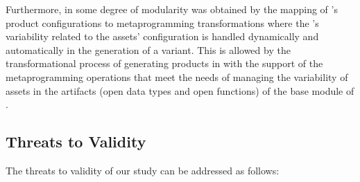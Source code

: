 Furthermore, in \hpl{} some degree of modularity was obtained by the mapping of \hpl's product configurations to metaprogramming transformations where the \hpl's variability related to the assets' configuration is handled dynamically and automatically in the generation of a \hpl{} variant. This is allowed by the transformational process of generating products in \hpl{} with the support of the metaprogramming operations that meet the needs of managing the variability of assets in the artifacts (open data types and open functions) of the base module of \hpl.




\subsection{Threats to Validity} \label{sec:threats}

The threats to validity of our study can be addressed as follows:

